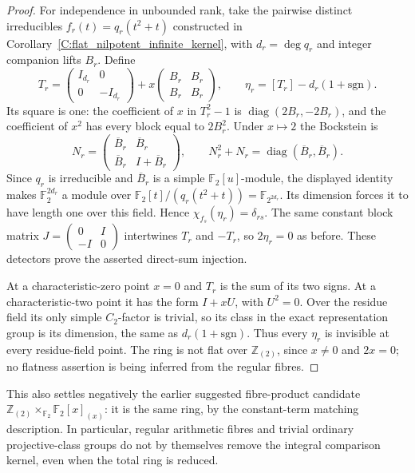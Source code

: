 \begin{proof}
For independence in unbounded rank, take the pairwise distinct
irreducibles $f_r(t)=q_r(t^2+t)$ constructed in
Corollary~\ref{C:flat_nilpotent_infinite_kernel}, with
$d_r=\deg q_r$ and integer companion lifts $B_r$. Define
\[
 T_r=\begin{pmatrix}I_{d_r}&0\\0&-I_{d_r}\end{pmatrix}
   +x\begin{pmatrix}B_r&B_r\\B_r&B_r\end{pmatrix},
 \qquad\eta_r=[T_r]-d_r(1+\mathrm{sgn}).               \tag{C.1.20}
\]
Its square is one: the coefficient of $x$ in $T_r^2-1$ is
$\operatorname{diag}(2B_r,-2B_r)$, and the coefficient of $x^2$
has every block equal to $2B_r^2$. Under $x\mapsto2$ the
Bockstein is
\[
 N_r=\begin{pmatrix}\overline B_r&\overline B_r\\
                  \overline B_r&I+\overline B_r\end{pmatrix},
 \qquad N_r^2+N_r=\operatorname{diag}(\overline B_r,
                                     \overline B_r).
\]
Since $q_r$ is irreducible and $\overline B_r$ is a simple
$\mathbb F_2[u]$-module, the displayed identity makes
$\mathbb F_2^{2d_r}$ a module over
$\mathbb F_2[t]/(q_r(t^2+t))=\mathbb F_{2^{2d_r}}$.
Its dimension forces it to have length one over this field.
Hence $\chi_{f_s}(\eta_r)=\delta_{rs}$.
The same constant block matrix
$J=\left(\begin{smallmatrix}0&I\\-I&0\end{smallmatrix}\right)$
intertwines $T_r$ and $-T_r$, so $2\eta_r=0$ as before.
These detectors prove the asserted direct-sum injection.

At a characteristic-zero point $x=0$ and $T_r$ is the sum of
its two signs. At a characteristic-two point it has the form
$I+xU$, with $U^2=0$. Over the residue field its only simple
$C_2$-factor is trivial, so its class in the exact representation
group is its dimension, the same as $d_r(1+\mathrm{sgn})$.
Thus every $\eta_r$ is invisible at every residue-field point.
The ring is not flat over $\mathbb Z_{(2)}$, since $x\ne0$
and $2x=0$; no flatness assertion is being inferred from the
regular fibres.
\end{proof}

This also settles negatively the earlier suggested fibre-product
candidate
$\mathbb Z_{(2)}\times_{\mathbb F_2}\mathbb F_2[x]_{(x)}$:
it is the same ring, by the constant-term matching description.
In particular, regular arithmetic fibres and trivial ordinary
projective-class groups do not by themselves remove the integral
comparison kernel, even when the total ring is reduced.
